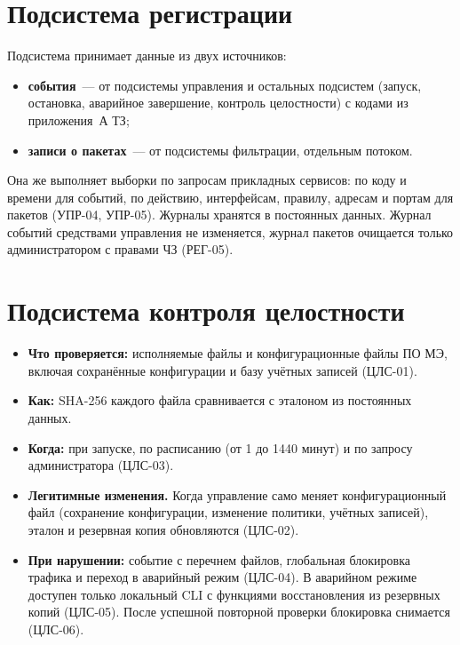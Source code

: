 \documentclass[12pt,a4paper,final]{article}
\begin{document}
\section{Подсистема регистрации}\label{sec:log}

Подсистема принимает данные из двух источников:
\begin{itemize}
\item \textbf{события}~— от подсистемы управления и остальных подсистем
  (запуск, остановка, аварийное завершение, контроль целостности) с кодами
  из приложения~А ТЗ;
\item \textbf{записи о пакетах}~— от подсистемы фильтрации, отдельным потоком.
\end{itemize}
Она же выполняет выборки по запросам прикладных сервисов: по коду и времени
для событий, по действию, интерфейсам, правилу, адресам и портам для пакетов
(УПР-04, УПР-05). Журналы хранятся в постоянных данных. Журнал событий
средствами управления не изменяется, журнал пакетов очищается только
администратором с правами ЧЗ (РЕГ-05).

\section{Подсистема контроля целостности}\label{sec:integrity}

\begin{itemize}
\item \textbf{Что проверяется:} исполняемые файлы и конфигурационные файлы
  ПО МЭ, включая сохранённые конфигурации и базу учётных записей (ЦЛС-01).
\item \textbf{Как:} SHA-256 каждого файла сравнивается с эталоном из постоянных
  данных.
\item \textbf{Когда:} при запуске, по расписанию (от 1 до 1440 минут) и по
  запросу администратора (ЦЛС-03).
\item \textbf{Легитимные изменения.} Когда управление само меняет
  конфигурационный файл (сохранение конфигурации, изменение политики, учётных
  записей), эталон и резервная копия обновляются (ЦЛС-02).
\item \textbf{При нарушении:} событие с перечнем файлов, глобальная блокировка
  трафика и переход в аварийный режим (ЦЛС-04). В аварийном режиме доступен
  только локальный CLI с функциями восстановления из резервных копий
  (ЦЛС-05). После успешной повторной проверки блокировка снимается (ЦЛС-06).
\end{itemize}
\end{document}
